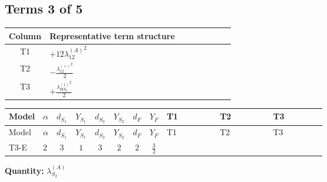 \documentclass[8pt]{article}
\begin{document}
\begin{landscape}
\subsection*{Terms 3 of 5}
\begin{center}
\begin{tabular}{@{}c >{\raggedright\arraybackslash}p{0.82\linewidth}@{}}
\toprule
Column & Representative term structure \\
\midrule
T1 & \(\displaystyle +12 {\lambda_{12}^{(A)}}^2\) \\
\midrule
T2 & \(\displaystyle -\frac{{\lambda_{12}^{(\times)}}^2}{2}\) \\
\midrule
T3 & \(\displaystyle +\frac{{\lambda_{HS_2}^{(1)}}^2}{2}\) \\
\midrule
\bottomrule
\end{tabular}
\end{center}
\smallskip
\tiny
\begin{longtable}{@{}llcccccc >{\raggedright\arraybackslash}p{0.21\linewidth} >{\raggedright\arraybackslash}p{0.21\linewidth} >{\raggedright\arraybackslash}p{0.21\linewidth}@{}}
\toprule
Model & $\alpha$ & $d_{S_1}$ & $Y_{S_1}$ & $d_{S_2}$ & $Y_{S_2}$ & $d_F$ & $Y_F$ & T1 & T2 & T3 \\
\midrule
\endfirsthead
\toprule
Model & $\alpha$ & $d_{S_1}$ & $Y_{S_1}$ & $d_{S_2}$ & $Y_{S_2}$ & $d_F$ & $Y_F$ & T1 & T2 & T3 \\
\midrule
\endhead
T3-E & $2$ & $3$ & $1$ & $3$ & $2$ & $2$ & $\frac{3}{2}$ & \scriptsize\adjustbox{max width=\linewidth}{$\begin{gathered} +12 {\lambda_{12}^{(A)}}^2\end{gathered}$} & \scriptsize\adjustbox{max width=\linewidth}{$\begin{gathered} -\frac{{\lambda_{12}^{(\times)}}^2}{2}\end{gathered}$} & \scriptsize\adjustbox{max width=\linewidth}{$\begin{gathered} +\frac{{\lambda_{HS_2}^{(1)}}^2}{2}\end{gathered}$} \\
\midrule
\bottomrule
\end{longtable}
\clearpage
\noindent\textbf{Quantity: }$\lambda_{S_2}^{(A)}$\par\smallskip

\end{landscape}
\end{document}
